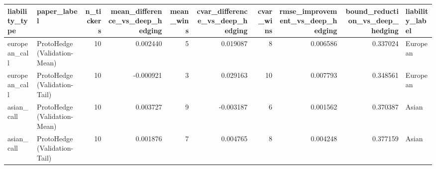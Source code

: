 \begin{tabular}{llrrrrrrrl}
\toprule
liability\_type & paper\_label & n\_tickers & mean\_difference\_vs\_deep\_hedging & mean\_wins & cvar\_difference\_vs\_deep\_hedging & cvar\_wins & rmse\_improvement\_vs\_deep\_hedging & bound\_reduction\_vs\_deep\_hedging & liability\_label \\
\midrule
european\_call & ProtoHedge (Validation-Mean) & 10 & 0.002440 & 5 & 0.019087 & 8 & 0.006586 & 0.337024 & European \\
european\_call & ProtoHedge (Validation-Tail) & 10 & -0.000921 & 3 & 0.029163 & 10 & 0.007793 & 0.348561 & European \\
asian\_call & ProtoHedge (Validation-Mean) & 10 & 0.003727 & 9 & -0.003187 & 6 & 0.001562 & 0.370387 & Asian \\
asian\_call & ProtoHedge (Validation-Tail) & 10 & 0.001876 & 7 & 0.004765 & 8 & 0.004248 & 0.377159 & Asian \\
\bottomrule
\end{tabular}
